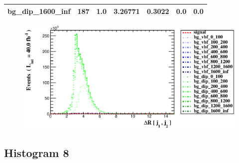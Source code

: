 \documentclass[a4paper, 10pt]{article}
\begin{document}
\begin{table}[H]
\begin{center}
\begin{tabular}{|m{23.0mm}|m{23.0mm}|m{18.0mm}|m{19.0mm}|m{19.0mm}|m{19.0mm}|m{19.0mm}|}
      \hline
      {\cellcolor{white}         bg\_dip\_1600\_inf}& {\cellcolor{white}         187}& {\cellcolor{white}         1.0}& {\cellcolor{white}         3.26771}& {\cellcolor{white}         0.3022}& {\cellcolor{green}         0.0}& {\cellcolor{green}         0.0}\\
\hline
    \end{tabular}
  \end{center}
\end{table}

\begin{figure}[H]
  \begin{center}
    \includegraphics[scale=0.45]{selection_6.eps}\\
\caption{   }
  \end{center}
\end{figure}
      \newpage
\subsection{ Histogram 8}
\end{document}
